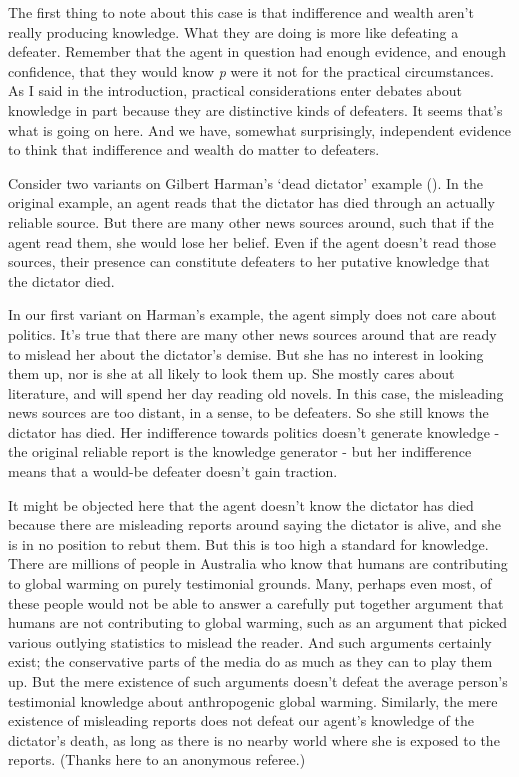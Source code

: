 \documentclass[
  10pt,
  letterpaper,
  DIV=11,
  numbers=noendperiod,
  twoside]{scrartcl}
\begin{document}
The first thing to note about this case is that indifference and wealth
aren't really producing knowledge. What they are doing is more like
defeating a defeater. Remember that the agent in question had enough
evidence, and enough confidence, that they would know \emph{p} were it
not for the practical circumstances. As I said in the introduction,
practical considerations enter debates about knowledge in part because
they are distinctive kinds of defeaters. It seems that's what is going
on here. And we have, somewhat surprisingly, independent evidence to
think that indifference and wealth do matter to defeaters.

Consider two variants on Gilbert Harman's `dead dictator' example
(). In the original example,
an agent reads that the dictator has died through an actually reliable
source. But there are many other news sources around, such that if the
agent read them, she would lose her belief. Even if the agent doesn't
read those sources, their presence can constitute defeaters to her
putative knowledge that the dictator died.

In our first variant on Harman's example, the agent simply does not care
about politics. It's true that there are many other news sources around
that are ready to mislead her about the dictator's demise. But she has
no interest in looking them up, nor is she at all likely to look them
up. She mostly cares about literature, and will spend her day reading
old novels. In this case, the misleading news sources are too distant,
in a sense, to be defeaters. So she still knows the dictator has died.
Her indifference towards politics doesn't generate knowledge - the
original reliable report is the knowledge generator - but her
indifference means that a would-be defeater doesn't gain traction.

It might be objected here that the agent doesn't know the dictator has
died because there are misleading reports around saying the dictator is
alive, and she is in no position to rebut them. But this is too high a
standard for knowledge. There are millions of people in Australia who
know that humans are contributing to global warming on purely
testimonial grounds. Many, perhaps even most, of these people would not
be able to answer a carefully put together argument that humans are not
contributing to global warming, such as an argument that picked various
outlying statistics to mislead the reader. And such arguments certainly
exist; the conservative parts of the media do as much as they can to
play them up. But the mere existence of such arguments doesn't defeat
the average person's testimonial knowledge about anthropogenic global
warming. Similarly, the mere existence of misleading reports does not
defeat our agent's knowledge of the dictator's death, as long as there
is no nearby world where she is exposed to the reports. (Thanks here to
an anonymous referee.)
\end{document}
